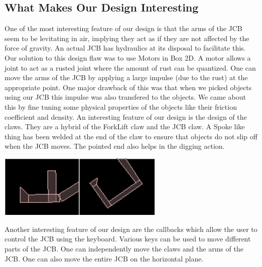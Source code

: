 \documentclass[11pt]{article}
\begin{document}
	\subsection{What Makes Our Design Interesting}
	One of the most interesting feature of our design is that the arms of the JCB seem to be levitating in air, implying they act as if they are not affected by the force of gravity. An actual JCB has hydraulics at its disposal to facilitate this.
 Our solution to this design flaw was to use Motors in Box 2D. A motor allows a joint to act as a rusted joint where the amount of rust can be quantized. One can move the arms of the JCB by applying a large impulse (due to the rust) at the appropriate point. One major drawback of this was that when we picked objects using our JCB this impulse was also transfered to the objects. We came about this by fine tuning some physical properties of the objects like their friction coefficient and density.\newline
	An interesting feature of our design is the design of the claws. They are a hybrid of the ForkLift claw and the JCB claw. A Spoke like thing has been welded at the end of the claw to ensure that objects do not slip off when the JCB moves. The pointed end also helps in the digging action.\newline
	\begin{center}\includegraphics[height=3cm]{Left_Claw1.png}\includegraphics[height=3cm]{Right_Claw.png}\end{center}	
	Another interesting feature of our design are the callbacks which allow the user to control the JCB using the keyboard.
Various keys can be used to move different parts of the JCB. One can independently move the claws and the arms of the JCB. One can also move the entire JCB on the horizontal plane.
\end{document}
